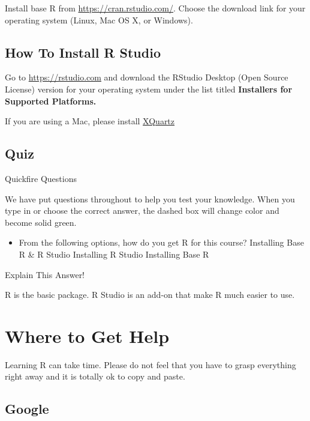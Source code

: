 \documentclass[]{book}
\providecommand{\tightlist}{%
  \setlength{\itemsep}{0pt}\setlength{\parskip}{0pt}}
\begin{document}
Install base R from \url{https://cran.rstudio.com/}. Choose the download link for your operating system (Linux, Mac OS X, or Windows).

\hypertarget{how-to-install-r-studio}{%
\subsection{How To Install R Studio}\label{how-to-install-r-studio}}

Go to \url{https://rstudio.com} and download the RStudio Desktop (Open Source License) version for your operating system under the list titled \textbf{Installers for Supported Platforms.}

If you are using a Mac, please install \href{https://www.xquartz.org/}{XQuartz}

\hypertarget{quiz}{%
\subsection{Quiz}\label{quiz}}

{Quickfire Questions}

We have put questions throughout to help you test your knowledge. When you type in or choose the correct answer, the dashed box will change color and become solid green.

\begin{itemize}
\tightlist
\item
  From the following options, how do you get R for this course? Installing Base R \& R Studio Installing R Studio Installing Base R
\end{itemize}

Explain This Answer!

R is the basic package. R Studio is an add-on that make R much easier to use.

\hypertarget{where-to-get-help}{%
\section{Where to Get Help}\label{where-to-get-help}}

Learning R can take time. Please do not feel that you have to grasp everything right away and it is totally ok to copy and paste.

\hypertarget{google}{%
\subsection{Google}\label{google}}
\end{document}
